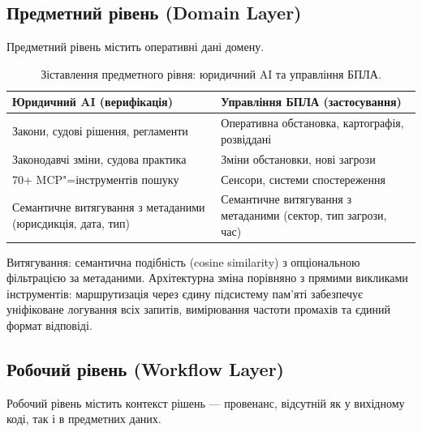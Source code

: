 \documentclass[11pt]{article}
\begin{document}


\subsection{Предметний рівень (Domain Layer)}

Предметний рівень містить оперативні дані домену.

\begin{table}[ht]
\centering
\caption{Зіставлення предметного рівня: юридичний AI та управління БПЛА.}
\label{tab:domain-mapping}
\begin{tabular}{@{}p{5.5cm}p{5.5cm}@{}}
\toprule
\textbf{Юридичний AI (верифікація)} & \textbf{Управління БПЛА (застосування)} \\
\midrule
Закони, судові рішення, регламенти & Оперативна обстановка, картографія, розвіддані \\
Законодавчі зміни, судова практика & Зміни обстановки, нові загрози \\
70+ MCP"=інструментів пошуку & Сенсори, системи спостереження \\
Семантичне витягування з метаданими (юрисдикція, дата, тип) & Семантичне витягування з метаданими (сектор, тип загрози, час) \\
\bottomrule
\end{tabular}
\end{table}

Витягування: семантична подібність (cosine similarity) з опціональною фільтрацією за метаданими.
Архітектурна зміна порівняно з прямими викликами інструментів: маршрутизація через єдину підсистему пам'яті забезпечує уніфіковане логування всіх запитів, вимірювання частоти промахів та єдиний формат відповіді.

\subsection{Робочий рівень (Workflow Layer)}

Робочий рівень містить контекст рішень --- провенанс, відсутній як у вихідному коді, так і в предметних даних.
\end{document}

